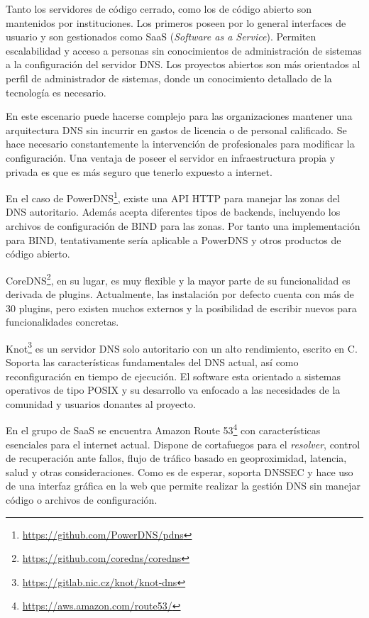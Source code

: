 Tanto los servidores de código cerrado, como los de código abierto son mantenidos por instituciones. Los primeros poseen por lo general interfaces de usuario y son gestionados como SaaS (\textit{Software as a Service}). Permiten escalabilidad y acceso a personas sin conocimientos de administración de sistemas a la configuración del servidor DNS. Los proyectos abiertos son más orientados al perfil de administrador de sistemas, donde un conocimiento detallado de la tecnología es necesario.

En este escenario puede hacerse complejo para las organizaciones mantener una arquitectura DNS sin incurrir en gastos de licencia o de personal calificado. Se hace necesario constantemente la intervención de profesionales para modificar la configuración. Una ventaja de poseer el servidor en infraestructura propia y privada es que es más seguro que tenerlo expuesto a internet.

En el caso de PowerDNS\footnote{\url{https://github.com/PowerDNS/pdns}}, existe una API HTTP para manejar las zonas del DNS autoritario. Además acepta diferentes tipos de backends, incluyendo los archivos de configuración de BIND para las zonas. Por tanto una implementación para BIND, tentativamente sería aplicable a PowerDNS y otros productos de código abierto.

CoreDNS\footnote{\url{https://github.com/coredns/coredns}}, en su lugar, es muy flexible y la mayor parte de su funcionalidad es derivada de plugins. Actualmente, las instalación por defecto cuenta con más de 30 plugins, pero existen muchos externos y la posibilidad de escribir nuevos para funcionalidades concretas.

Knot\footnote{\url{https://gitlab.nic.cz/knot/knot-dns}} es un servidor DNS solo autoritario con un alto rendimiento, escrito en C. Soporta las características fundamentales del DNS actual, así como reconfiguración en tiempo de ejecución. El software esta orientado a sistemas operativos de tipo POSIX y su desarrollo va enfocado a las necesidades de la comunidad y usuarios donantes al proyecto.

En el grupo de SaaS se encuentra Amazon Route 53\footnote{\url{https://aws.amazon.com/route53/}} con características esenciales para el internet actual. Dispone de cortafuegos para el \textit{resolver}, control de recuperación ante fallos, flujo de tráfico basado en geoproximidad, latencia, salud y otras consideraciones. Como es de esperar, soporta DNSSEC y hace uso de una interfaz gráfica en la web que permite realizar la gestión DNS sin manejar código o archivos de configuración.

